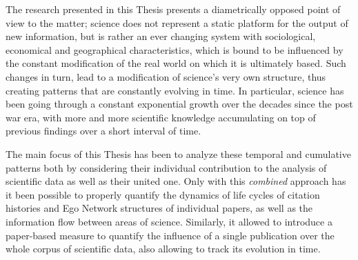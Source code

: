 The research presented in this Thesis presents a diametrically opposed point of view to the matter; science does not represent a static platform for the output 
of new information, but is rather an ever changing
system with sociological, economical and geographical characteristics, which is bound to be influenced by the constant modification of the real world on which it is ultimately based. Such changes in turn, lead to a modification of science's very own
structure, thus creating patterns that are constantly evolving in time. In particular, science has been going through a constant exponential growth over the decades
since the post war era, with more and more scientific knowledge accumulating on top of previous findings over a short interval of time. 

The main focus of this Thesis has been to analyze these temporal and cumulative patterns both by considering their individual contribution to the analysis of scientific
data as well as their united one. Only with this \textit{combined} approach has it been possible to properly quantify the dynamics of life cycles of citation histories and Ego Network
structures of individual papers, as well as the information flow between areas of science. Similarly, it allowed to introduce a paper-based measure to quantify the influence of a single 
publication over the whole corpus of scientific data, also allowing to track its evolution in time.
